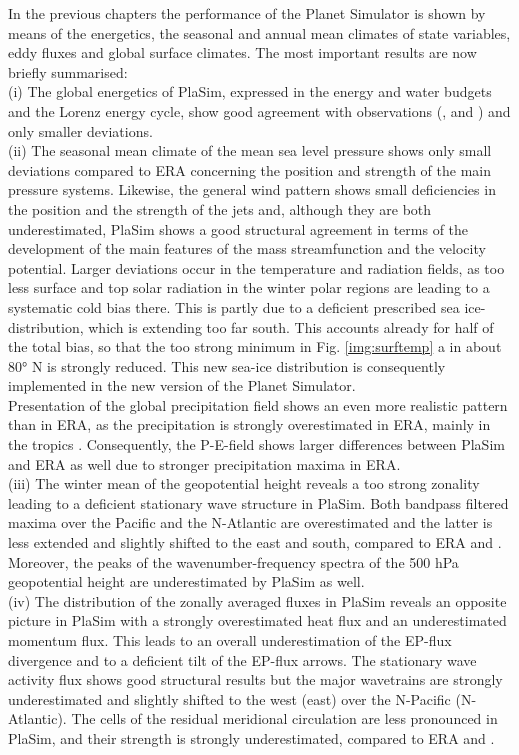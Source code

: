 In the previous chapters the performance of the Planet Simulator is shown by means of the energetics, the seasonal and annual mean climates of state variables, eddy fluxes and global surface climates. The most important results are now briefly summarised:\\
(i) The global energetics of PlaSim, expressed in the energy and water budgets and the Lorenz energy cycle, show good agreement with observations (\citet{Kiehl1997}, \citet{Trenberth2006} and \citet{Peixoto1993}) and only smaller deviations.\\  
(ii) The seasonal mean climate of the mean sea level pressure shows only small deviations compared to ERA concerning the position and strength of the main pressure systems. Likewise, the general wind pattern shows small deficiencies in the position and the strength of the jets and, although they are both underestimated, PlaSim shows a good structural agreement in terms of the development of the main features of the mass streamfunction and the velocity potential. Larger deviations occur in the temperature and radiation fields, as too less surface and top solar radiation in the winter polar regions are leading to a systematic cold bias there. This is partly due to a deficient prescribed sea ice-distribution, which is extending too far south. This accounts already for half of the total bias, so that the too strong minimum in Fig. \ref{img:surftemp} a in about 80° N is strongly reduced. This new sea-ice distribution is consequently implemented in the new version of the Planet Simulator.\\
Presentation of the global precipitation field shows an even more realistic pattern than in ERA, as the precipitation is strongly overestimated in ERA, mainly in the tropics \citep{Hagemann2005}. Consequently, the P-E-field shows larger differences between PlaSim and ERA as well due to stronger precipitation maxima in ERA.\\ 
(iii) The winter mean of the geopotential height reveals a too strong zonality leading to a deficient stationary wave structure  in PlaSim. Both bandpass filtered maxima over the Pacific and the N-Atlantic are overestimated and the latter is less extended and slightly shifted to the east and south, compared to ERA and \citet[p. 83]{Roeckner1996}. Moreover, the peaks of the wavenumber-frequency spectra of the 500 hPa geopotential height are underestimated by PlaSim as well.\\
(iv) The distribution of the zonally averaged fluxes in PlaSim reveals an opposite picture in PlaSim with a strongly overestimated heat flux and an underestimated momentum flux. This leads to an overall underestimation of the EP-flux divergence and to a deficient tilt of the EP-flux arrows. The stationary wave activity flux shows good structural results but the major wavetrains are strongly underestimated and slightly shifted to the west (east) over the N-Pacific (N-Atlantic). The cells of the residual meridional circulation are less pronounced in PlaSim, and their strength is strongly underestimated, compared to ERA and \citet[p. 325]{Holton1992}.\\
